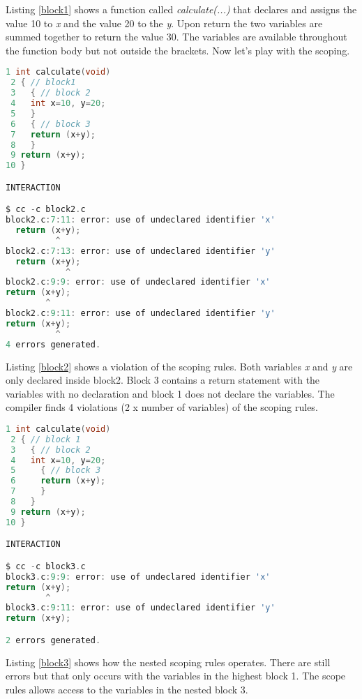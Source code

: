 Listing \ref{block1} shows a function called \textit{calculate(...)} that declares and assigns the value 10 to \textit{x} and the value 20 to the \textit{y}. Upon return the two variables are summed together to return the value 30. The variables are available throughout the function body but not outside the brackets. Now let's play with the scoping.\\

\begin{lstlisting}[language=C,caption={File block2.c, block scope with error},captionpos=b,label=block2]
 1 int calculate(void)
 2 { // block1
 3   { // block 2
 4   int x=10, y=20;
 5   }
 6   { // block 3
 7   return (x+y);
 8   }
 9 return (x+y);
10 }

INTERACTION

$ cc -c block2.c
block2.c:7:11: error: use of undeclared identifier 'x'
  return (x+y);
          ^
block2.c:7:13: error: use of undeclared identifier 'y'
  return (x+y);
            ^
block2.c:9:9: error: use of undeclared identifier 'x'
return (x+y);
        ^
block2.c:9:11: error: use of undeclared identifier 'y'
return (x+y);
          ^
4 errors generated.
\end{lstlisting}

Listing \ref{block2} shows a violation of the scoping rules. Both variables \textit{x} and \textit{y} are only declared inside block2. Block 3 contains a return statement with the variables with no declaration and block 1 does not declare the variables. The compiler finds 4 violations (2 x number of variables) of the scoping rules. 
 
\begin{lstlisting}[language=C,caption={File block3.c, block nested scoping with error},captionpos=b,label=block3]
 1 int calculate(void)
 2 { // block 1
 3   { // block 2
 4   int x=10, y=20; 
 5     { // block 3 
 6     return (x+y);
 7     }
 8   }
 9 return (x+y);
10 }

INTERACTION

$ cc -c block3.c
block3.c:9:9: error: use of undeclared identifier 'x'
return (x+y);
        ^
block3.c:9:11: error: use of undeclared identifier 'y'
return (x+y);

2 errors generated.
\end{lstlisting}

Listing \ref{block3} shows how the nested scoping rules operates. There are still errors but that only occurs with the variables in the highest block 1. The scope rules allows access to the variables in the nested block 3. 

